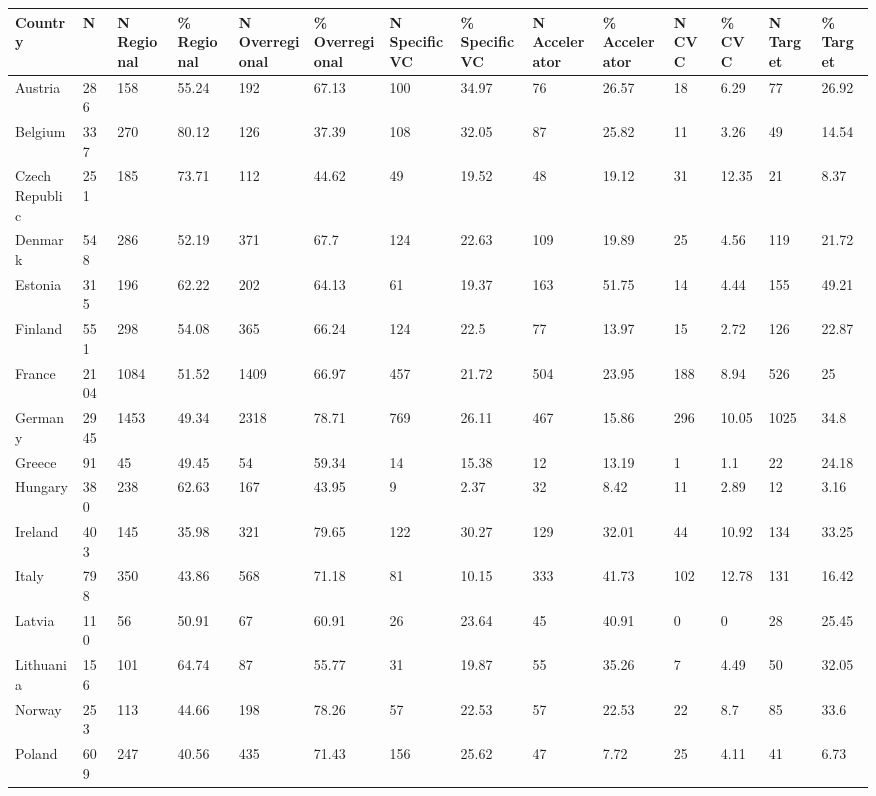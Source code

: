 \begin{tabular}{llllllllllllll}
  \toprule
Country & N & N Regional & \% Regional & N Overregional & \% Overregional & N Specific VC & \% Specific VC & N Accelerator & \% Accelerator & N CVC & \% CVC & N Target & \% Target \\ 
  \midrule
Austria & 286 & 158 & 55.24 & 192 & 67.13 & 100 & 34.97 & 76 & 26.57 & 18 & 6.29 & 77 & 26.92 \\ 
  Belgium & 337 & 270 & 80.12 & 126 & 37.39 & 108 & 32.05 & 87 & 25.82 & 11 & 3.26 & 49 & 14.54 \\ 
  Czech Republic & 251 & 185 & 73.71 & 112 & 44.62 & 49 & 19.52 & 48 & 19.12 & 31 & 12.35 & 21 & 8.37 \\ 
  Denmark & 548 & 286 & 52.19 & 371 & 67.7 & 124 & 22.63 & 109 & 19.89 & 25 & 4.56 & 119 & 21.72 \\ 
  Estonia & 315 & 196 & 62.22 & 202 & 64.13 & 61 & 19.37 & 163 & 51.75 & 14 & 4.44 & 155 & 49.21 \\ 
  Finland & 551 & 298 & 54.08 & 365 & 66.24 & 124 & 22.5 & 77 & 13.97 & 15 & 2.72 & 126 & 22.87 \\ 
  France & 2104 & 1084 & 51.52 & 1409 & 66.97 & 457 & 21.72 & 504 & 23.95 & 188 & 8.94 & 526 & 25 \\ 
  Germany & 2945 & 1453 & 49.34 & 2318 & 78.71 & 769 & 26.11 & 467 & 15.86 & 296 & 10.05 & 1025 & 34.8 \\ 
  Greece & 91 & 45 & 49.45 & 54 & 59.34 & 14 & 15.38 & 12 & 13.19 & 1 & 1.1 & 22 & 24.18 \\ 
  Hungary & 380 & 238 & 62.63 & 167 & 43.95 & 9 & 2.37 & 32 & 8.42 & 11 & 2.89 & 12 & 3.16 \\ 
  Ireland & 403 & 145 & 35.98 & 321 & 79.65 & 122 & 30.27 & 129 & 32.01 & 44 & 10.92 & 134 & 33.25 \\ 
  Italy & 798 & 350 & 43.86 & 568 & 71.18 & 81 & 10.15 & 333 & 41.73 & 102 & 12.78 & 131 & 16.42 \\ 
  Latvia & 110 & 56 & 50.91 & 67 & 60.91 & 26 & 23.64 & 45 & 40.91 & 0 & 0 & 28 & 25.45 \\ 
  Lithuania & 156 & 101 & 64.74 & 87 & 55.77 & 31 & 19.87 & 55 & 35.26 & 7 & 4.49 & 50 & 32.05 \\ 
  Norway & 253 & 113 & 44.66 & 198 & 78.26 & 57 & 22.53 & 57 & 22.53 & 22 & 8.7 & 85 & 33.6 \\ 
  Poland & 609 & 247 & 40.56 & 435 & 71.43 & 156 & 25.62 & 47 & 7.72 & 25 & 4.11 & 41 & 6.73 \\ 

\end{tabular}
